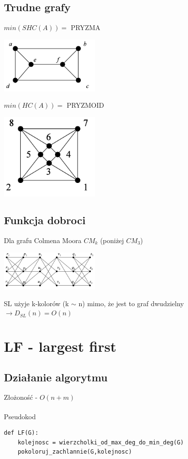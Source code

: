 \documentclass{article}
\begin{document}
\subsection{Trudne grafy}
$min(SHC(A)) = $ PRYZMA 
\begin{center}
\includegraphics[width=5cm]{pryzma}
\end{center}
$min(HC(A)) = $ PRYZMOID
\begin{center}
\includegraphics[width=5cm]{pryzmoid}
\end{center}
\subsection{Funkcja dobroci}
Dla grafu Colmena Moora $CM_k$ (poniżej $CM_3$)
\begin{center}
\includegraphics[width=5cm]{CM}
\end{center}
SL użyje k-kolorów (k $\sim$ n) mimo, że jest to graf dwudzielny $\rightarrow D_{SL}(n) = O(n)$

\section{LF - largest first}
\subsection{Działanie algorytmu}
Złożoność - $O(n+m)$ \\\\
Pseudokod
\begin{lstlisting}
def LF(G):
	kolejnosc = wierzcholki_od_max_deg_do_min_deg(G)
	pokoloruj_zachlannie(G,kolejnosc)
\end{lstlisting}
\end{document}
